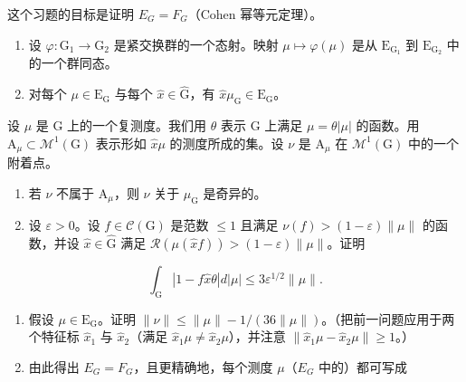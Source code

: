   这个习题的目标是证明 \(E_{G} = F_{G}\)（Cohen 幂等元定理）。

\begin{enumerate}
\def\labelenumi{\alph{enumi})}
\item
  设 \(\varphi\colon\mathrm{G}_{1}\to\mathrm{G}_{2}\) 是紧交换群的一个态射。映射 \(\mu\mapsto\varphi(\mu)\) 是从 \(\mathrm{E}_{\mathrm{G}_{1}}\) 到 \(\mathrm{E}_{\mathrm{G}_{2}}\) 中的一个群同态。
\item
  对每个 \(\mu \in \mathrm{E}_{\mathrm{G}}\) 与每个 \(\widehat{x} \in \widehat{\mathrm{G}}\)，有 \(\widehat{x}\mu_{\mathrm{G}} \in \mathrm{E}_{\mathrm{G}}\)。
\end{enumerate}

  设 \(\mu\) 是 G 上的一个复测度。我们用 \(\theta\) 表示 G 上满足 \(\mu = \theta |\mu|\) 的函数。用 \(\mathrm{A}_{\mu} \subset \mathcal{M}^{1}(\mathrm{G})\) 表示形如 \(\widehat{x}\mu\) 的测度所成的集。设 \(\nu\) 是 \(\mathrm{A}_{\mu}\) 在 \(\mathcal{M}^{1}(\mathrm{G})\) 中的一个附着点。

\begin{enumerate}
\def\labelenumi{\alph{enumi})}
\setcounter{enumi}{2}
\tightlist
\item
  若 \(\nu\) 不属于 \(\mathrm{A}_{\mu}\)，则 \(\nu\) 关于 \(\mu_{\mathrm{G}}\) 是奇异的。\\
\item
  设 \(\varepsilon > 0\)。设 \(f \in \mathcal{C}(\mathrm{G})\) 是范数 \(\leqslant 1\) 且满足 \(\nu(f) > (1 - \varepsilon)\|\mu\|\) 的函数，并设 \(\widehat{x} \in \widehat{\mathrm{G}}\) 满足 \(\mathcal{R}(\mu(\widehat{x} f)) > (1 - \varepsilon)\|\mu\|\)。证明
\end{enumerate}

\[
\int_ {\mathrm{G}} | 1 - f \widehat {x} \theta | d | \mu | \leqslant 3 \varepsilon^ {1 / 2} \| \mu \|.
\]

\begin{enumerate}
\def\labelenumi{\alph{enumi})}
\setcounter{enumi}{4}
\item
  假设 \(\mu \in \mathrm{E}_{\mathrm{G}}\)。证明 \(\| \nu \| \leqslant \| \mu \| - 1 / (36 \| \mu \|)\)。（把前一问题应用于两个特征标 \(\widehat{x}_1\) 与 \(\widehat{x}_2\)（满足 \(\widehat{x}_1 \mu \neq \widehat{x}_2 \mu\)），并注意 \(\| \widehat{x}_1 \mu - \widehat{x}_2 \mu \| \geqslant 1\)。）
\item
  由此得出 \(E_{G} = F_{G}\)，且更精确地，每个测度 \(\mu\)（\(E_{G}\) 中的）都可写成
\end{enumerate}

